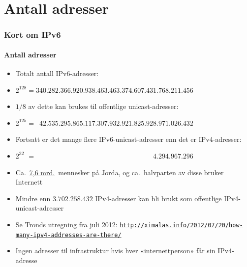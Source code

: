 \section{Antall adresser}
\begin{frame}%
  \frametitle{Kort om IPv6}
  \framesubtitle{Antall adresser}
  \begin{itemize}%
  \item Totalt antall IPv6-adresser:
  \item \(2^{128}=340.282.366.920.938.463.463.374.607.431.768.211.456\)
  \item \(1/8\) av dette kan brukes til offentlige unicast-adresser:
  \item
    \(2^{125}=\phantom{0}42.535.295.865.117.307.932.921.825.928.971.026.432\)
  \item Fortsatt er det mange flere IPv6-unicast-adresser enn det er
    IPv4-adresser:
  \item
    \(2^{32\phantom{0}}=\phantom{000.000.000.000.000.000.000.000.000.00}4.294.967.296\)
  \item Ca.\ \href{https://en.wikipedia.org/wiki/World_population}{7,6
      mrd.}\ mennesker på Jorda, og ca.\ halvparten av disse bruker Internett
  \item Mindre enn \alert<2>{\(3.702.258.432\)} IPv4-adresser kan bli
    brukt som offentlige IPv4-unicast-adresser
  \item Se Tronds utregning fra juli 2012:
    \texttt{\url{http://ximalas.info/2012/07/20/how-many-ipv4-addresses-are-there/}}
  \item Ingen adresser til infrastruktur hvis hver «internettperson»
    får sin IPv4-adresse
  \end{itemize}
\end{frame}

